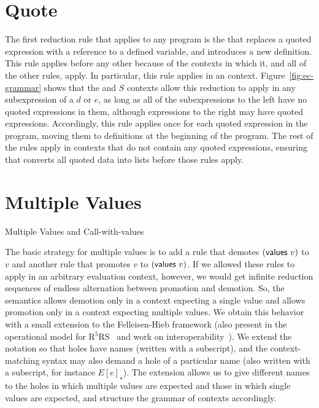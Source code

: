 \section{Quote}

The first reduction rule that applies to any program is the
 that replaces a quoted expression with a reference
to a defined variable, and introduces a new definition. This rule
applies before any other because of the contexts in which it, and all
of the other rules, apply. In particular, this rule applies in an
 context. Figure~\ref{fig:ec-grammar} shows that the
 and $S$ contexts allow this reduction to apply in
any subexpression of a $d$ or $e$, as long as all of the
subexpressions to the left have no quoted expressions in them,
although expressions to the right may have quoted expressions.
Accordingly, this rule applies once for each quoted expression in the
program, moving them to definitions at the beginning of the program.
The rest of the rules apply in contexts that do not contain any quoted
expressions, ensuring that  converts all quoted data
into lists before those rules apply.

\section{Multiple Values}

\beginfig
\begin{center}

\end{center}
\caption{Multiple Values and Call-with-values}\label{fig:multiple-values-and-call-with-values}
\endfig

The basic strategy for multiple values is to add a rule that demotes
$(\textnormal{\textsf{values}}~v)$ to $v$ and another rule that promotes
$v$ to $(\textnormal{\textsf{values}}~v)$. If we allowed these rules to apply
in an arbitrary evaluation context, however, we would get infinite
reduction sequences of endless alternation between promotion and
demotion. So, the semantics allows demotion only in a context
expecting a single value and allows promotion only in a context
expecting multiple values. We obtain this behavior with a small
extension to the Felleisen-Hieb framework (also present in the
operational model for R$^5$RS~\cite{mf:op-r5rs} and work on
interoperability~\cite{mf:interop}). We extend the notation so that
holes have names (written with a subscript), and the context-matching
syntax may also demand a hole of a particular name (also written with
a subscript, for instance $E[e]_{\star}$).  The extension
allows us to give different names to the holes in which multiple
values are expected and those in which single values are expected, and
structure the grammar of contexts accordingly.

